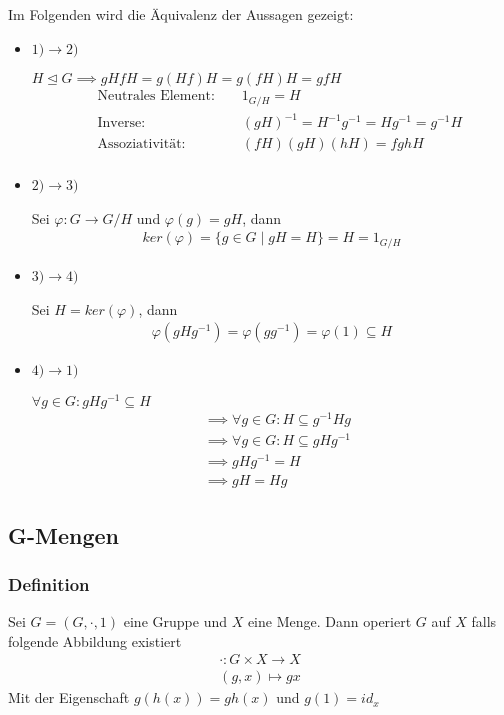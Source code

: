 \documentclass[12pt, german]{article}
\begin{document}
	Im Folgenden wird die Äquivalenz der Aussagen gezeigt: 
	\begin{itemize}
		\item $1)\rightarrow 2)$ ~\par
		$H\trianglelefteq G \implies gHfH = g(Hf)H = g(fH)H = gfH$
		\begin{align*}
			&\text{ Neutrales Element: } &&1_{G/H} = H \\
			&\text{ Inverse: } &&(gH)^{-1} = H^{-1}g^{-1}= Hg^{-1}=g^{-1}H \\
			&\text{ Assoziativität: } &&(fH)(gH)(hH)= fghH\\
		\end{align*}
		
		\item $2)\rightarrow 3)$ ~\par
		Sei $\varphi : G \to G/H $ und $\varphi(g) = gH$, dann
		\begin{align*}
			ker(\varphi) = \{g \in G \mid gH = H\} = H = 1_{G/H}
		\end{align*}
		
		\item $3)\rightarrow 4)$~\par
		Sei $H = ker(\varphi)$, dann
		\begin{align*}
			\varphi(gHg^{-1}) = \varphi(gg^{-1}) = \varphi(1) \subseteq H 
		\end{align*}
		
		\item $4)\rightarrow 1)$~\par
		$\forall g \in G : gHg^{-1} \subseteq H$
		\begin{align*}
			&\implies  \forall g \in G : H \subseteq g^{-1}Hg \\
			&\implies \forall g \in G : H \subseteq gHg^{-1} \\
			&\implies gHg^{-1} = H \\
			&\implies gH = Hg
		\end{align*}
	\end{itemize}
	
	
	
	\subsection{G-Mengen}		
	\subsubsection{Definition}
	Sei $G = (G, \cdot, 1)$ eine Gruppe und $X$ eine Menge.
	Dann operiert $G$ auf $X$ falls folgende Abbildung existiert 
	\begin{align*}
		\cdot : G \times X \to X \\ 
		(g,x) \mapsto gx
	\end{align*}
	Mit der Eigenschaft $g(h(x)) = gh(x)$ und $g(1) = id_x$
	
\end{document}
